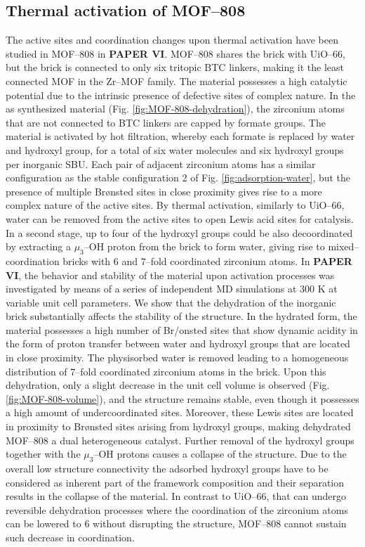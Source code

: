 \subsection*{Thermal activation of MOF--808}
The active sites and coordination changes upon thermal activation have been studied in MOF--808 in \textbf{PAPER VI}. MOF--808 shares the  brick with UiO--66, but the brick is connected to only six tritopic BTC linkers, making it the least connected MOF in the Zr--MOF family. The material possesses a high catalytic potential due to the intrinsic presence of defective sites of complex nature. In the as synthesized material (Fig. \ref{fig:MOF-808-dehydration}), the zirconium atoms that are not connected to BTC linkers are capped by formate groups. The material is activated by hot filtration, whereby each formate is replaced by water and hydroxyl group, for a total of six water molecules and six hydroxyl groups per inorganic SBU. Each pair of adjacent zirconium atoms has a similar configuration as the stable configuration 2 of Fig. \ref{fig:adsorption-water}, but the presence of multiple Br\o{}nsted sites in close proximity gives rise to a more complex nature of the active sites. By thermal activation, similarly to UiO--66, water can be removed from the active sites to open Lewis acid sites for catalysis. In a second stage, up to four of the hydroxyl groups could be also decoordinated by extracting a $\mu_3$--OH proton from the brick to form water, giving rise to mixed--coordination bricks with 6 and 7--fold coordinated zirconium atoms.
\npar
In \textbf{PAPER VI}, the behavior and stability of the material upon activation processes was investigated by means of a series of independent MD simulations at 300 K at variable unit cell parameters. We show that the dehydration of the inorganic brick substantially affects the stability of the structure. In the hydrated form, the material possesses a high number of Br/o{}nsted sites that show dynamic acidity in the form of proton transfer between water and hydroxyl groups that are located in close proximity. The physisorbed water is removed leading to a homogeneous distribution of 7--fold coordinated zirconium atoms in the brick. Upon this dehydration, only a slight decrease in the unit cell volume is observed (Fig. \ref{fig:MOF-808-volume}), and the structure remains stable, even though it possesses a high amount of undercoordinated sites. Moreover, these Lewis sites are located in proximity to Br\o{}nsted sites arising from hydroxyl groups, making dehydrated MOF--808 a dual heterogeneous catalyst. Further removal of the hydroxyl groups together with the $\mu_3$--OH protons causes a collapse of the structure. Due to the overall low structure connectivity the adsorbed hydroxyl groups have to be considered as inherent part of the framework composition and their separation results in the collapse of the material. In contrast to UiO--66, that can undergo reversible dehydration processes where the coordination of the zirconium atoms can be lowered to 6 without disrupting the structure, MOF--808 cannot sustain such decrease in coordination.


